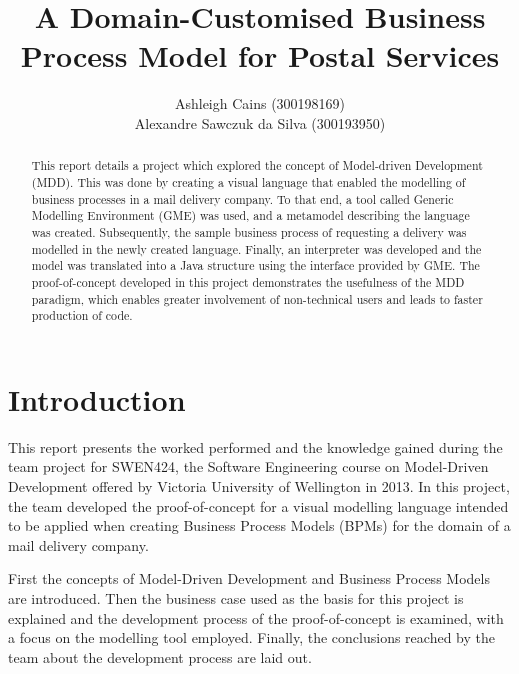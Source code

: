 \documentclass[11pt, a4paper, oneside, openright]{article}
\title{A Domain-Customised Business Process Model for Postal Services}
\author{Ashleigh Cains (300198169) \\ Alexandre Sawczuk da Silva (300193950)}
\begin{document}
\frontmatter


\begin{abstract}
This report details a project which explored the concept of Model-driven
Development (MDD). This was done by creating a visual language that enabled the
modelling of business processes in a mail delivery company. To that end, a tool
called Generic Modelling Environment (GME) was used, and a metamodel describing
the language was created. Subsequently, the sample business process of
requesting a delivery was modelled in the newly created language. Finally, an
interpreter was developed and the model was translated into a Java structure
using the interface provided by GME. The proof-of-concept developed in this
project demonstrates the usefulness of the MDD paradigm, which enables greater
involvement of non-technical users and  leads to faster production of code.
\end{abstract}


\maketitle




\mainmatter


\section{Introduction}

This report presents the worked performed and the knowledge gained during the
team project for SWEN424, the Software Engineering course on Model-Driven
Development offered by Victoria University of Wellington in 2013. In this
project, the team developed the proof-of-concept for a visual modelling language
intended to be applied when creating Business Process Models (BPMs) for the
domain of a mail delivery company.

First the concepts of Model-Driven Development and Business Process Models
are introduced. Then the business case used as the basis for this project is
explained and the development process of the proof-of-concept is examined, with
a focus on the modelling tool employed. Finally, the conclusions reached by the
team about the development process are laid out.
\end{document}
